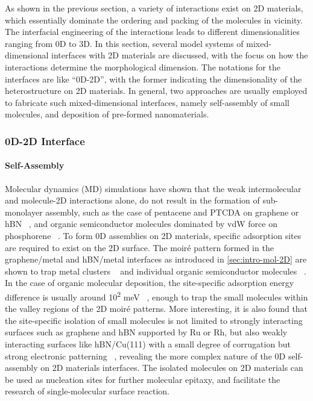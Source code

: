 As shown in the previous section, a variety of interactions exist on 2D
materials, which
essentially dominate the ordering and packing of the molecules in vicinity.
%
The interfacial engineering of the interactions leads to different
dimensionalities ranging from 0D to 3D.
%
In this section, several model systems of mixed-dimensional interfaces
with 2D materials are discussed, with the focus on how the
interactions determine the morphological dimension. The notations for
the interfaces are like ``0D-2D'', with the former indicating the
dimensionality of the heterostructure on 2D materials. In general, two
approaches are usually employed to fabricate such mixed-dimensional
interfaces, namely self-assembly of small molecules, and deposition of
pre-formed nano\-materials. 

\subsubsection{0D-2D Interface}
\label{sec:intro-0D-2D}

\paragraph{Self-Assembly}
\label{sec:org8117691}

Molecular dynamics (MD) simulations have shown that the weak
intermolecular and molecule-2D interactions alone, do not result in
the formation of sub-monolayer assembly, such as the case of pentacene
and PTCDA on graphene or hBN ~\cite{Zhao_2015_self_assemb_gr_MD}, and
organic semiconductor molecules dominated by vdW force on phosphorene
~\cite{Mukhopadhyay_2017_cryst_BP}.
% 
To form 0D assemblies on 2D materials, specific adsorption sites are
required to exist on the 2D surface.
% 
The moiré pattern formed in the graphene/metal and hBN/metal
interfaces as introduced in \autoref{sec:intro-mol-2D} are shown to
trap metal clusters
~\cite{Goriachko_2007_assembl_hBN_ru,Pan_2009_Pt_cluster_gr,Wang_2011_gr_hBN_metal_cl,Zhang_2014_metal_gr_Ru}
and individual organic semiconductor molecules
~\cite{Joshi_2014_TCNQ_hBN,Dil_2008_hBN_Rh,Lu_2012_c60_gr_moire}.
%
In the case of organic molecular deposition, the site-specific
adsorption energy difference is usually around 10\textsuperscript{2}
meV ~\cite{Lu_2012_c60_gr_moire}, enough to trap the small molecules
within the valley regions of the 2D moiré patterns. More interesting,
it is also found that the site-specific isolation of small molecules
is not limited to strongly interacting surfaces such as graphene and
hBN supported by Ru or Rh, but also weakly interacting surfaces like
hBN/Cu(111) with a small degree of corrugation but strong electronic
patterning ~\cite{Joshi_2012_hBN_Cu,Joshi_2014_TCNQ_hBN}, revealing the
more complex nature of the 0D self-assembly on 2D materials interfaces.
%
The isolated molecules on 2D materials can be used as nucleation sites
for further molecular epitaxy, and facilitate the research of
single-molecular surface reaction. 


